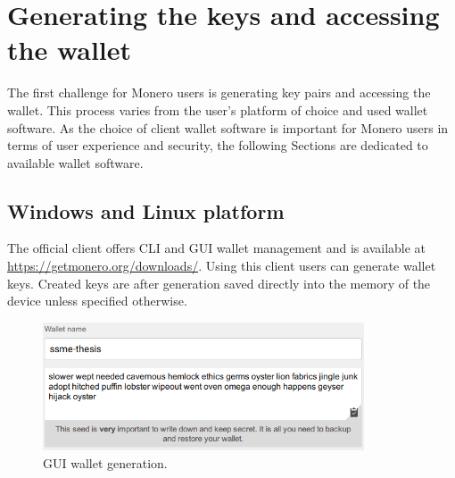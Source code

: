 \documentclass[
  printed, %
  table,   %
  lof,     %
  lot,     %
           oneside, color
]{fithesis3}
\begin{document}
\section{Generating the keys and accessing the wallet}
The first challenge for Monero users is generating key pairs and accessing the wallet. This process varies from the user's platform of choice and used wallet software. As the choice of client wallet software is important for Monero users in terms of user experience and security, the following Sections are dedicated to available wallet software. %
\subsection{Windows and Linux platform}
The official client offers CLI and GUI wallet management and is available at \url{https://getmonero.org/downloads/}. Using this client users can generate wallet keys. Created keys are after generation saved directly into the memory of the device unless specified otherwise. 
\vspace{-0.9em}
\begin{figure}[H]
\begin{center}
 \includegraphics[trim={0 0 0 0},clip,width=0.85\textwidth]{Screenshot_4.png}
    \caption{GUI wallet generation.}
    \label{pic:guigenerator}
\end{center}
    \end{figure}
\end{document}

